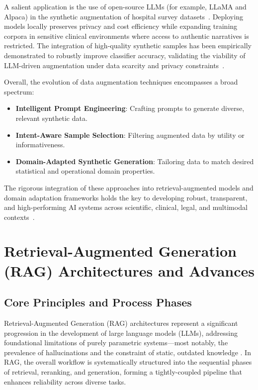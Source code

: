 A salient application is the use of open-source LLMs (for example, LLaMA and Alpaca) in the synthetic augmentation of hospital survey datasets~\cite{ref57}. Deploying models locally preserves privacy and cost efficiency while expanding training corpora in sensitive clinical environments where access to authentic narratives is restricted. The integration of high-quality synthetic samples has been empirically demonstrated to robustly improve classifier accuracy, validating the viability of LLM-driven augmentation under data scarcity and privacy constraints~\cite{ref57}.

Overall, the evolution of data augmentation techniques encompasses a broad spectrum:

\begin{itemize}
    \item \textbf{Intelligent Prompt Engineering}: Crafting prompts to generate diverse, relevant synthetic data.
    \item \textbf{Intent-Aware Sample Selection}: Filtering augmented data by utility or informativeness.
    \item \textbf{Domain-Adapted Synthetic Generation}: Tailoring data to match desired statistical and operational domain properties.
\end{itemize}

The rigorous integration of these approaches into retrieval-augmented models and domain adaptation frameworks holds the key to developing robust, transparent, and high-performing AI systems across scientific, clinical, legal, and multimodal contexts~\cite{ref5,ref10,ref12,ref15,ref16,ref22,ref24,ref31,ref32,ref36,ref37,ref43,ref48,ref49,ref52,ref54,ref55,ref61,ref62,ref57}.

\section{Retrieval-Augmented Generation (RAG) Architectures and Advances}

\subsection{Core Principles and Process Phases}

Retrieval-Augmented Generation (RAG) architectures represent a significant progression in the development of large language models (LLMs), addressing foundational limitations of purely parametric systems—most notably, the prevalence of hallucinations and the constraint of static, outdated knowledge \cite{ref4, ref5, ref8, ref10, ref14, ref15, ref16, ref17, ref35, ref36, ref37, ref42, ref52, ref54, ref55, ref64}. In RAG, the overall workflow is systematically structured into the sequential phases of retrieval, reranking, and generation, forming a tightly-coupled pipeline that enhances reliability across diverse tasks.

